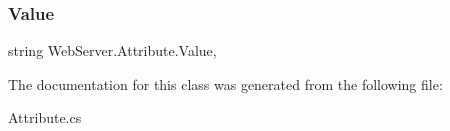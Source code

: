 \subsubsection{\texorpdfstring{Value}{Value}}
{\footnotesize\ttfamily string Web\+Server.\+Attribute.\+Value\hspace{0.3cm}{\ttfamily [get]}, {\ttfamily [set]}}







The documentation for this class was generated from the following file\+:\begin{DoxyCompactItemize}
\item 
Attribute.\+cs\end{DoxyCompactItemize}
